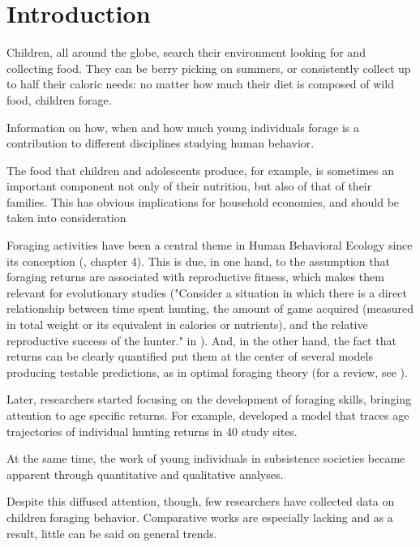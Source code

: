 \section{Introduction}
Children, all around the globe, search their environment looking for and collecting food. 
They can be berry picking on summers, or consistently collect up to half their caloric needs: no matter how much their diet is composed of wild food, children forage. 

Information on how, when and how much young individuals forage is a contribution to  different disciplines studying human behavior.

The food that children and adolescents produce, for example, is sometimes an important component not only of their nutrition, but also of that of their families. This has obvious implications for household economies, and should be taken into consideration 





Foraging activities have been a central theme in Human Behavioral Ecology since its conception (\cite{laland_sense_2011}, chapter 4). This is due, in one hand, to the assumption that foraging returns are associated with reproductive fitness, which makes them relevant for evolutionary studies ("Consider a situation in which there is a direct relationship between time spent hunting, the amount of game acquired (measured in total weight or its equivalent in calories or nutrients), and the relative reproductive success of the hunter." in \cite{hawkes_how_1985}). And, in the other hand, the fact that returns can be clearly quantified put them at the center of several models producing testable predictions, as in optimal foraging theory (for a review, see \cite{smith_anthropological_1983}). 

Later, researchers started focusing on the development of foraging skills, bringing attention to age specific returns. For example, \cite{koster_life_2019} developed a model that traces age trajectories of individual hunting returns in 40 study sites. 

At the same time, the work of young individuals in subsistence societies became apparent through quantitative and qualitative analyses.
 

Despite this diffused attention, though, few researchers have collected data on children foraging behavior. Comparative works are especially lacking and as a result, little can be said on general trends. 

